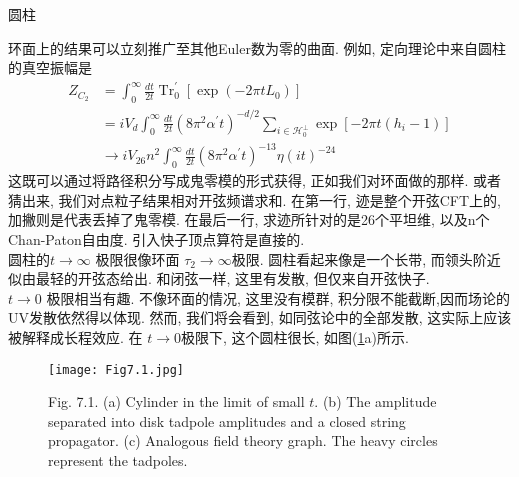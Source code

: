 \centerline{\Large 圆柱}
环面上的结果可以立刻推广至其他Euler数为零的曲面. 例如, 定向理论中来自圆柱的真空振幅是
\begin{equation}
	\begin{aligned}
		Z_{C_{2}} &=\int_{0}^{\infty} \frac{d t}{2 t} \operatorname{Tr}_{0}^{\prime}\left[\exp \left(-2 \pi t L_{0}\right)\right] \\
		&=i V_{d} \int_{0}^{\infty} \frac{d t}{2 t}\left(8 \pi^{2} \alpha^{\prime} t\right)^{-d / 2} \sum_{i \in \mathscr{H}_{0}^{\perp}} \exp \left[-2 \pi t\left(h_{i}-1\right)\right] \\
		& \rightarrow i V_{26} n^{2} \int_{0}^{\infty} \frac{d t}{2 t}\left(8 \pi^{2} \alpha^{\prime} t\right)^{-13} \eta(i t)^{-24}
	\end{aligned}
\end{equation}
这既可以通过将路径积分写成鬼零模的形式获得, 正如我们对环面做的那样. 或者猜出来, 我们对点粒子结果相对开弦频谱求和. 在第一行, 迹是整个开弦CFT上的, 加撇则是代表丢掉了鬼零模. 在最后一行, 求迹所针对的是26个平坦维, 以及n个Chan-Paton自由度. 引入快子顶点算符是直接的. \\
圆柱的$t \rightarrow \infty$ 极限很像环面 $\tau_{2} \rightarrow \infty$极限. 圆柱看起来像是一个长带, 而领头阶近似由最轻的开弦态给出. 和闭弦一样, 这里有发散, 但仅来自开弦快子.\\
$t \rightarrow 0$ 极限相当有趣. 不像环面的情况, 这里没有模群, 积分限不能截断,因而场论的UV发散依然得以体现. 然而, 我们将会看到, 如同弦论中的全部发散, 这实际上应该被解释成长程效应. 在 $t \rightarrow 0$极限下, 这个圆柱很长, 如图(\ref{Fig7.1}a)所示. 
\begin{figure}
	\begin{center}
		\texttt{[image: Fig7.1.jpg]}\\
		\caption{Fig. 7.1. (a) Cylinder in the limit of small $t$. (b) The amplitude separated into disk tadpole amplitudes and a closed string propagator. (c) Analogous field theory graph. The heavy circles represent the tadpoles.}\label{Fig7.1}
	\end{center}
\end{figure}

